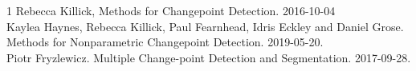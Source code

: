 \documentclass[runningheads,a4paper,12pt]{report}
\begin{document}
\begin{thebibliography}{1}
Rebecca Killick, Methods for Changepoint Detection. 2016-10-04\\

Kaylea Haynes, Rebecca Killick, Paul Fearnhead, Idris Eckley and Daniel Grose. Methods for Nonparametric Changepoint Detection. 2019-05-20.\\

Piotr Fryzlewicz. Multiple Change-point Detection and Segmentation. 2017-09-28. \\



\end{thebibliography}
\end{document}
